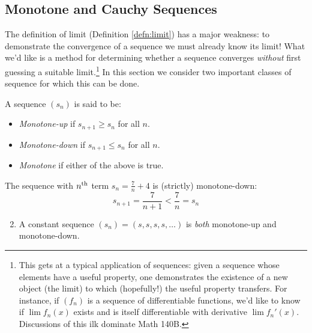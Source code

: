 \clearpage



\subsection{Monotone and Cauchy Sequences}\label{sec:monocauchy}

The definition of limit (Definition \ref{defn:limit}) has a major weakness: to demonstrate the convergence of a sequence we must already know its limit! What we'd like is a method for determining whether a sequence converges \emph{without} first guessing a suitable limit.\footnote{%
	This gets at a typical application of sequences: given a sequence whose elements have a useful property, one demonstrates the existence of a new object (the limit) to which (hopefully!) the useful property transfers. For instance, if $(f_n)$ is a sequence of differentiable functions, we'd like to know if $\lim f_n(x)$ exists and is itself differentiable with derivative $\lim f_n'(x)$. Discussions of this ilk dominate Math 140B.%
}
In this section we consider two important classes of sequence for which this can be done.

\begin{defn}{}{}
	A sequence $(s_n)$ is said to be:
	\begin{itemize}
	  \item \emph{Monotone-up\footnotemark} if $s_{n+1}\ge s_n$ for all $n$.
		\item \emph{Monotone-down} if $s_{n+1}\le s_n$ for all $n$.
		\item \emph{Monotone} if either of the above is true.
	\end{itemize}
\end{defn}


\begin{examples}{}{}
	\exstart The sequence with $n\textsuperscript{th}$ term $s_n=\frac 7n+4$ is (strictly) monotone-down:
	\[
		s_{n+1}=\frac 7{n+1}<\frac 7n=s_n
	\]
	\begin{enumerate}\setcounter{enumi}{1}
	  \item A constant sequence $(s_n)=(s,s,s,s,\ldots)$ is \emph{both} monotone-up and monotone-down.
	\end{enumerate}
\end{examples}


